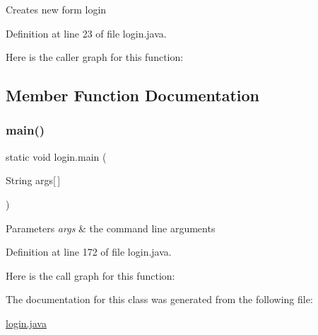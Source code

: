 Creates new form login 

Definition at line 23 of file login.\+java.

Here is the caller graph for this function\+:


\subsection{Member Function Documentation}
\mbox{\label{classlogin_aad3485790bebb6435902a963b96cc93a}} 
\subsubsection{\texorpdfstring{main()}{main()}}
{\footnotesize\ttfamily static void login.\+main (\begin{DoxyParamCaption}\item[{String}]{args\mbox{[}$\,$\mbox{]} }\end{DoxyParamCaption})\hspace{0.3cm}{\ttfamily [static]}}


\begin{DoxyParams}{Parameters}
{\em args} & the command line arguments \\
\hline
\end{DoxyParams}


Definition at line 172 of file login.\+java.

Here is the call graph for this function\+:


The documentation for this class was generated from the following file\+:\begin{DoxyCompactItemize}
\item 
\mbox{\hyperlink{login_8java}{login.\+java}}\end{DoxyCompactItemize}
